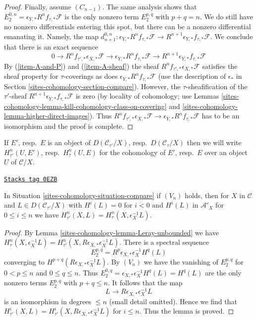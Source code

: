 \begin{proof}
\medskip\noindent
Finally, assume $(C_{n - 1})$. The same analysis shows that
$E_2^{0, n} = \epsilon_{Y, *}R^nf_{\tau, *}\mathcal{F}$
is the only nonzero term $E_2^{p, q}$ with $p + q = n$.
We do still have no nonzero differentials entering
this spot, but there can be a nonzero differential
emanating it. Namely, the map
$d_{n + 1}^{0, n} : \epsilon_{Y, *}R^nf_{\tau, *}\mathcal{F} \to
R^{n + 1}\epsilon_{Y, *}f_{\tau, *}\mathcal{F}$.
We conclude that there is an exact sequence
$$
0 \to R^nf_{\tau', *}\epsilon_{X, *}\mathcal{F} \to
\epsilon_{Y, *}R^nf_{\tau, *}\mathcal{F} \to
R^{n + 1}\epsilon_{Y, *}f_{\tau, *}\mathcal{F}
$$
By (\ref{item-A-and-P}) and (\ref{item-A-sheaf}) the sheaf
$R^nf_{\tau', *}\epsilon_{X, *}\mathcal{F}$
satisfies the sheaf property for $\tau$-coverings
as does $\epsilon_{Y, *}R^nf_{\tau, *}\mathcal{F}$
(use the description of $\epsilon_*$ in Section \ref{sites-cohomology-section-compare}).
However, the $\tau$-sheafification of the $\tau'$-sheaf
$R^{n + 1}\epsilon_{Y, *}f_{\tau, *}\mathcal{F}$
is zero (by locality of cohomology; use
Lemmas \ref{sites-cohomology-lemma-kill-cohomology-class-on-covering} and
\ref{sites-cohomology-lemma-higher-direct-images}).
Thus $R^nf_{\tau', *}\epsilon_{X, *}\mathcal{F} \to
\epsilon_{Y, *}R^nf_{\tau, *}\mathcal{F}$
has to be an isomorphism and the proof is complete.
\end{proof}

If $E'$, resp.\ $E$ is an object of
$D(\mathcal{C}_{\tau'}/X)$, resp.\ $D(\mathcal{C}_\tau/X)$
then we will write
$H^n_{\tau'}(U, E')$, resp.\ $H^n_\tau(U, E)$
for the cohomology of $E'$, resp.\ $E$
over an object $U$ of $\mathcal{C}/X$.

\begin{lemma}
\label{sites-cohomology-lemma-V-implies-cohomology-general}
\href{https://stacks.math.columbia.edu/tag/0EZB}{\texttt{Stacks tag 0EZB}}

In Situation \ref{sites-cohomology-situation-compare} if $(V_n)$ holds, then
for $X$ in $\mathcal{C}$ and $L \in D(\mathcal{C}_{\tau'}/X)$
with $H^i(L) = 0$ for $i < 0$ and $H^i(L)$ in $\mathcal{A}'_X$
for $0 \leq i \leq n$ we have
$H^n_{\tau'}(X, L) = H^n_\tau(X, \epsilon_X^{-1}L)$.
\end{lemma}

\begin{proof}
By Lemma \ref{sites-cohomology-lemma-Leray-unbounded} we have
$H^n_\tau(X, \epsilon_X^{-1}L) =
H^n_{\tau'}(X, R\epsilon_{X, *}\epsilon_X^{-1}L)$.
There is a spectral sequence
$$
E_2^{p, q} = R^p\epsilon_{X, *}\epsilon_X^{-1}H^q(L)
$$
converging to $H^{p + q}(R\epsilon_{X, *}\epsilon_X^{-1}L)$.
By $(V_n)$ we have the vanishing of $E_2^{p, q}$ for
$0 < p \leq n$ and $0 \leq q \leq n$. Thus
$E_2^{0, q} = \epsilon_{X, *}\epsilon_X^{-1}H^q(L) = H^q(L)$
are the only nonzero terms $E_2^{p, q}$ with $p + q \leq n$.
It follows that the map
$$
L \longrightarrow R\epsilon_{X, *}\epsilon_X^{-1}L
$$
is an isomorphism in degrees $\leq n$ (small detail omitted).
Hence we find that
$H^i_{\tau'}(X, L) = H^i_{\tau'}(X, R\epsilon_{X, *}\epsilon_X^{-1}L)$
for $i \leq n$. Thus the lemma is proved.
\end{proof}

